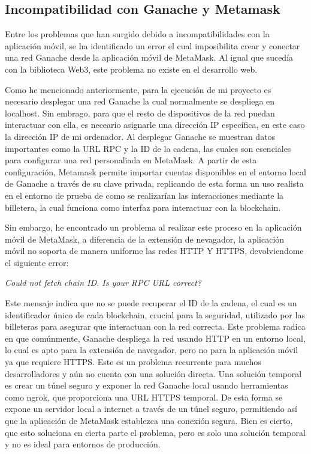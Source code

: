 \subsection{Incompatibilidad con Ganache y Metamask}

Entre los problemas que han surgido debido a incompatibilidades con la aplicación móvil, se ha identificado un error el cual imposibilita crear y conectar una red Ganache desde la aplicación móvil de MetaMask. Al igual que sucedía con la biblioteca Web3, este problema no existe en el desarrollo web.

Como he mencionado anteriormente, para la ejecución de mi proyecto es necesario desplegar una red Ganache la cual normalmente se despliega en localhost. Sin embrago, para que el resto de dispositivos de la red puedan interactuar con ella, es neceario asignarle una dirección IP específica, en este caso la dirección IP de mi ordenador.
Al desplegar Ganache se muestran datos importantes como la URL RPC y la ID de la cadena, las cuales son esenciales para configurar una red personaliada en MetaMask.
A partir de esta configuración, Metamask permite importar cuentas disponibles en el entorno local de Ganache a través de su clave privada, replicando de esta forma un uso realista en el entorno de prueba de como se realizarían las interacciones mediante la billetera, la cual funciona como interfaz para interactuar con la blockchain.

Sin embargo, he encontrado un problema al realizar este proceso en la aplicación móvil de MetaMask, a diferencia de la extensión de nevagador, la aplicación móvil no soporta de manera uniforme las redes HTTP Y HTTPS, devolviendome el siguiente error:

\textit{Could not fetch chain ID. Is your RPC URL correct?}

Este mensaje indica que no se puede recuperar el ID de la cadena, el cual es un identificador único de cada blockchain, crucial para la seguridad, utilizado por las billeteras para asegurar que interactuan con la red correcta.
Este problema radica en que comúnmente, Ganache despliega la red usando HTTP en un entorno local, lo cual es apto para la extensión de navegador, pero no para la aplicación móvil ya que requiere HTTPS.
Este es un problema recurrente para muchos desarrolladores y aún no cuenta con una solución directa. Una solución temporal es crear un túnel seguro y exponer la red Ganache local usando herramientas como ngrok, que proporciona una URL HTTPS temporal. De esta forma se expone un servidor local a internet a través de un túnel seguro, permitiendo así que la aplicación de MetaMask establezca una conexión segura.
Bien es cierto, que esto soluciona en cierta parte el problema, pero es solo una solución temporal y no es ideal para entornos de producción.


